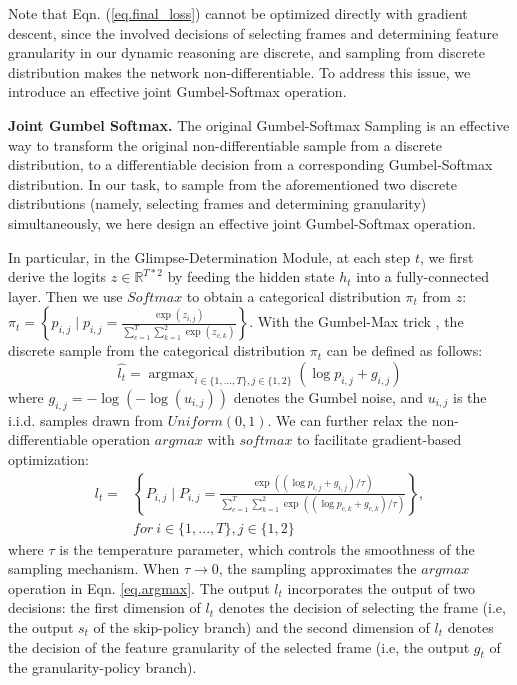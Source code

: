 \documentclass[final]{cvpr}
\begin{document}
Note that Eqn. (\ref{eq.final_loss}) cannot be optimized directly with gradient descent, since the involved decisions of selecting frames and determining feature granularity in our dynamic reasoning are discrete, and sampling from discrete distribution makes the network non-differentiable. To address this issue, we introduce an effective joint Gumbel-Softmax operation.

{\bf Joint Gumbel Softmax.} The original Gumbel-Softmax Sampling \cite{jang2016categorical} is an effective way to transform the original non-differentiable sample from a discrete distribution, to a differentiable decision from a corresponding Gumbel-Softmax distribution. In our task, to sample from the aforementioned two discrete distributions (namely, selecting frames and determining granularity) simultaneously, we here design an effective joint Gumbel-Softmax operation. 

In particular, in the Glimpse-Determination Module, at each step $t$, we first derive the logits $z \in\mathbb{R}^{T*2}$ by feeding the hidden state $h_t$ into a fully-connected layer. 
Then we use $Softmax$ to obtain a categorical distribution $\pi_t$ from $z$:
$\pi_t = \left\{ p_{i,j} \mid p_{i,j}=\frac{\exp(z_{i,j})}{\sum_{c=1}^T\sum_{k=1}^2\exp(z_{c,k})} \right\}$.
With the Gumbel-Max trick \cite{jang2016categorical}, the discrete sample from the categorical distribution $\pi_t$ can be defined as follows:
\begin{equation}\label{eq.argmax}
    \hat{l_t} = \mathop{\arg\max}_{i\in\{1,...,T\},j\in\{1,2\}} (\log p_{i,j} + g_{i,j})
\end{equation}
where $g_{i,j} = -\log (-\log(u_{i,j}))$ denotes the Gumbel noise, and $u_{i,j}$ is the i.i.d. samples drawn from $Uniform(0,1)$. We can further relax the non-differentiable operation $argmax$ with $softmax$ to facilitate gradient-based optimization:
\begin{equation}\label{eq.argmax_frame_relaxation}
\begin{aligned}
  l_t = &\left\{ P_{i,j} \mid P_{i,j}=\frac{\exp{((\log p_{i,j} + g_{i,j})/\tau)}}{\sum_{c=1}^{T}\sum_{k=1}^{2}\exp{((\log p_{c,k} + g_{c,k})/\tau)}}\right\},\\ 
    &for\ i\in\{1,...,T\}, j\in\{1,2\} 
\end{aligned}
\end{equation}
where $\tau$ is the temperature parameter, which controls the smoothness of the sampling mechanism. When $\tau\to0$, the sampling approximates the $argmax$ operation in Eqn. \ref{eq.argmax}. The output $l_t$ incorporates the output of two decisions: the first dimension of $l_t$ denotes the decision of selecting the frame (i.e, the output $s_t$ of the skip-policy branch) and the second dimension of $l_t$ denotes the decision of the feature granularity of the selected frame (i.e, the output $g_t$ of the granularity-policy branch).
\end{document}
